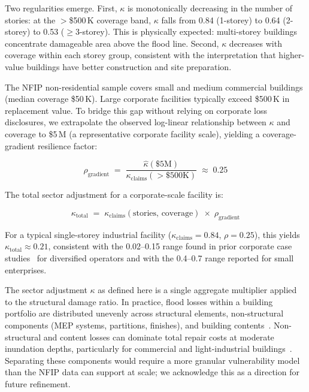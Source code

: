 Two regularities emerge. First, $\kappa$ is monotonically decreasing in the number of stories: at the $>$\$500\,K coverage band, $\kappa$ falls from 0.84 (1-storey) to 0.64 (2-storey) to 0.53 ($\geq$3-storey). This is physically expected: multi-storey buildings concentrate damageable area above the flood line. Second, $\kappa$ decreases with coverage within each storey group, consistent with the interpretation that higher-value buildings have better construction and site preparation.

The NFIP non-residential sample covers small and medium commercial buildings (median coverage \$50\,K). Large corporate facilities typically exceed \$500\,K in replacement value. To bridge this gap without relying on corporate loss disclosures, we extrapolate the observed log-linear relationship between $\kappa$ and coverage to \$5\,M (a representative corporate facility scale), yielding a coverage-gradient resilience factor:

\begin{equation}
    \rho_{\text{gradient}} \;=\;
    \frac{\hat{\kappa}(\$5\text{M})}{\kappa_{\text{claims}}(>\$500\text{K})}
    \;\approx\; 0.25
    \label{eq: rho gradient}
\end{equation}

The total sector adjustment for a corporate-scale facility is:

\begin{equation}
    \kappa_{\text{total}} \;=\;
    \kappa_{\text{claims}}(\text{stories, coverage})
    \;\times\;
    \rho_{\text{gradient}}
    \label{eq: kappa total}
\end{equation}

For a typical single-storey industrial facility ($\kappa_{\text{claims}} = 0.84$, $\rho = 0.25$), this yields $\kappa_{\text{total}} \approx 0.21$, consistent with the 0.02--0.15 range found in prior corporate case studies~\cite{merz2010review, huizinga2017global} for diversified operators and with the 0.4--0.7 range reported for small enterprises.

The sector adjustment $\kappa$ as defined here is a single aggregate multiplier applied to the structural damage ratio. In practice, flood losses within a building portfolio are distributed unevenly across structural elements, non-structural components (MEP systems, partitions, finishes), and building contents~\cite{forte2025flash}. Non-structural and content losses can dominate total repair costs at moderate inundation depths, particularly for commercial and light-industrial buildings~\cite{pistrika2014flood}. Separating these components would require a more granular vulnerability model than the NFIP data can support at scale; we acknowledge this as a direction for future refinement.

